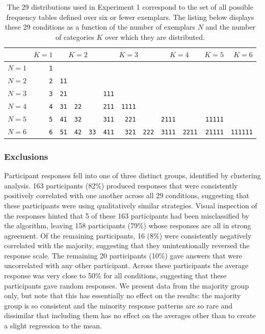 \documentclass[doc]{apa6}
\newcommand{\dist}[1]{\texttt{#1}}
\begin{document}
\begin{table}
\caption{The 29 distributions used in Experiment 1 correspond to the set of all possible frequency tables defined over six or fewer exemplars. The listing below displays these 29 conditions as a function of the number of exemplars $N$ and the number of categories $K$ over which they are distributed.\vspace*{6pt}}
\label{tab:exp1}
\footnotesize
\begin{tabular}{l|r|rrr|rrr|rr|r|r}
               & $K=1$  & \multicolumn{3}{c|}{$K=2$} & \multicolumn{3}{c|}{$K=3$}
               & \multicolumn{2}{c|}{$K=4$ } & $K=5$  & $K=6$
               \\ \hline
$N=1$  & \dist{1} &&&&&&&&&  \\
$N=2$  & \dist{2} & \dist{11} &&&&&&&&  \\
$N=3$  & \dist{3} & \dist{21} &&& \dist{111} &&&&& \\
$N=4$  & \dist{4} & \dist{31} & \dist{22} && \dist{211} & \dist{1111} &&&& \\
$N=5$  & \dist{5} & \dist{41} & \dist{32} && \dist{311} & \dist{221} && \dist{2111} && \dist{11111} \\
$N=6$  & \dist{6} & \dist{51} & \dist{42} & \dist{33} & \dist{411} & \dist{321} & \dist{222} & \dist{3111} & \dist{2211} & \dist{21111} & \dist{111111}
\end{tabular}
\end{table}


\subsubsection{Exclusions} Participant responses fell into one of three distinct groups, identified by clustering analysis. 163 participants (82\%) produced responses that were consistently positively correlated with one another across all 29 conditions, suggesting that these participants were using qualitatively similar strategies.  Visual inspection of the responses hinted that 5 of these 163 participants had been misclassified by the algorithm, leaving 158 participants (79\%) whose responses are all in strong agreement. Of the remaining participants, 16 (8\%) were consistently negatively correlated with the majority, suggesting that they unintentionally reversed the response scale. The remaining 20 participants (10\%) gave answers that were uncorrelated with any other participant. Across these participants the average response was very close to 50\% for all conditions, suggesting that these participants gave random responses. We present data from the majority group only, but note that this has essentially no effect on the results: the majority group is so consistent and the minority response patterns are so rare and dissimilar that including them has no effect on the averages other than to create a slight regression to the mean.
\end{document}
